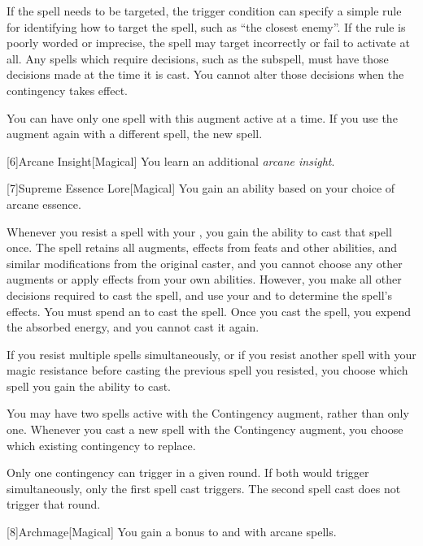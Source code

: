         If the spell needs to be targeted, the trigger condition can specify a simple rule for identifying how to target the spell, such as ``the closest enemy''.
        If the rule is poorly worded or imprecise, the spell may target incorrectly or fail to activate at all.
        Any spells which require decisions, such as the  subspell, must have those decisions made at the time it is cast.
        You cannot alter those decisions when the contingency takes effect.

        You can have only one spell with this augment active at a time.
        If you use the augment again with a different spell, the new spell.

        [6]{Arcane Insight}[Magical]
        You learn an additional \textit{arcane insight}.

        [7]{Supreme Essence Lore}[Magical]
        You gain an ability based on your choice of arcane essence.

         Whenever you resist a spell with your , you gain the ability to cast that spell once.
        The spell retains all augments, effects from feats and other abilities, and similar modifications from the original caster, and you cannot choose any other augments or apply effects from your own abilities.
        However, you make all other decisions required to cast the spell, and use your  and  to determine the spell's effects.
        You must spend an  to cast the spell.
        Once you cast the spell, you expend the absorbed energy, and you cannot cast it again.

        If you resist multiple spells simultaneously, or if you resist another spell with your magic resistance before casting the previous spell you resisted, you choose which spell you gain the ability to cast.

         You may have two spells active with the Contingency augment, rather than only one.
        Whenever you cast a new spell with the Contingency augment, you choose which existing contingency to replace.

        Only one contingency can trigger in a given round.
        If both would trigger simultaneously, only the first spell cast triggers.
        The second spell cast does not trigger that round.

        [8]{Archmage}[Magical]
        You gain a  bonus to  and  with arcane spells.

